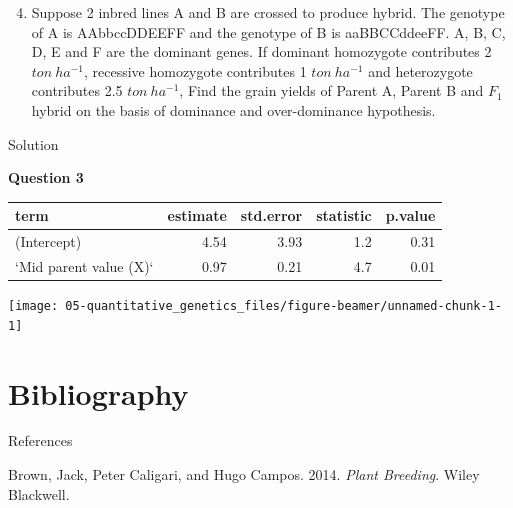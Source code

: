 \documentclass[11pt,dvipsnames,ignorenonframetext,aspectratio=169]{beamer}
\providecommand{\tightlist}{%
  \setlength{\itemsep}{0pt}\setlength{\parskip}{0pt}}
\begin{document}
\begin{frame}{}
\protect\hypertarget{section-17}{}

\begin{enumerate}
\setcounter{enumi}{3}
\tightlist
\item
  Suppose 2 inbred lines A and B are crossed to produce hybrid. The
  genotype of A is AAbbccDDEEFF and the genotype of B is aaBBCCddeeFF.
  A, B, C, D, E and F are the dominant genes. If dominant homozygote
  contributes 2 \(ton~ha^{-1}\), recessive homozygote contributes 1
  \(ton~ha^{-1}\) and heterozygote contributes 2.5 \(ton~ha^{-1}\), Find
  the grain yields of Parent A, Parent B and \(F_1\) hybrid on the basis
  of dominance and over-dominance hypothesis.
\end{enumerate}

\end{frame}

\begin{frame}{Solution}
\protect\hypertarget{solution-2}{}

\textbf{Question 3}

\begin{tabular}{lrrrr}
\toprule
term & estimate & std.error & statistic & p.value\\
\midrule
(Intercept) & 4.54 & 3.93 & 1.2 & 0.31\\
`Mid parent value (X)` & 0.97 & 0.21 & 4.7 & 0.01\\
\bottomrule
\end{tabular}

\texttt{[image: 05-quantitative\_genetics\_files/figure-beamer/unnamed-chunk-1-1]}

\end{frame}

\hypertarget{bibliography}{%
\section{Bibliography}\label{bibliography}}

\begin{frame}{References}
\protect\hypertarget{references}{}

\hypertarget{refs}{}
\leavevmode\hypertarget{ref-brown2014plantbreeding}{}%
Brown, Jack, Peter Caligari, and Hugo Campos. 2014. \emph{Plant
Breeding}. Wiley Blackwell.

\end{frame}
\end{document}
